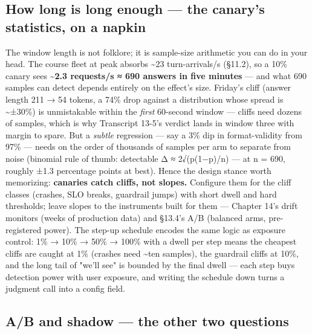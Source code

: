 \subsection*{How long is long enough — the canary's statistics, on a napkin}

The window length is not folklore; it is sample-size arithmetic you can do in your head. The course fleet at peak absorbs \textasciitilde{}23 turn-arrivals/s (§11.2), so a 10\% canary sees \textbf{\textasciitilde{}2.3 requests/s ≈ 690 answers in five minutes} — and what 690 samples can detect depends entirely on the effect's size. Friday's cliff (answer length 211 → 54 tokens, a 74\% drop against a distribution whose spread is \textasciitilde{}±30\%) is unmistakable within the \textit{first} 60-second window — cliffs need dozens of samples, which is why Transcript 13-5's verdict lands in window three with margin to spare. But a \textit{subtle} regression — say a 3\% dip in format-validity from 97\% — needs on the order of thousands of samples per arm to separate from noise (binomial rule of thumb: detectable Δ ≈ 2√(p(1−p)/n) — at n = 690, roughly ±1.3 percentage points at best). Hence the design stance worth memorizing: \textbf{canaries catch cliffs, not slopes.} Configure them for the cliff classes (crashes, SLO breaks, guardrail jumps) with short dwell and hard thresholds; leave slopes to the instruments built for them — Chapter 14's drift monitors (weeks of production data) and §13.4's A/B (balanced arms, pre-registered power). The step-up schedule encodes the same logic as exposure control: 1\% → 10\% → 50\% → 100\% with a dwell per step means the cheapest cliffs are caught at 1\% (crashes need \textasciitilde{}ten samples), the guardrail cliffs at 10\%, and the long tail of "we'll see" is bounded by the final dwell — each step buys detection power with user exposure, and writing the schedule down turns a judgment call into a config field.

\subsection*{A/B and shadow — the other two questions}

